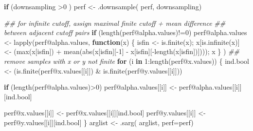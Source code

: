 \documentclass[
  letterpaper,
  DIV=11,
  numbers=noendperiod]{scrartcl}
\newenvironment{Shaded}{\begin{snugshade}}{\end{snugshade}}
\newcommand{\AttributeTok}[1]{\textcolor[rgb]{0.40,0.45,0.13}{#1}}
\newcommand{\ControlFlowTok}[1]{\textcolor[rgb]{0.00,0.23,0.31}{\textbf{#1}}}
\newcommand{\DecValTok}[1]{\textcolor[rgb]{0.68,0.00,0.00}{#1}}
\newcommand{\DocumentationTok}[1]{\textcolor[rgb]{0.37,0.37,0.37}{\textit{#1}}}
\newcommand{\FunctionTok}[1]{\textcolor[rgb]{0.28,0.35,0.67}{#1}}
\newcommand{\NormalTok}[1]{\textcolor[rgb]{0.00,0.23,0.31}{#1}}
\newcommand{\OtherTok}[1]{\textcolor[rgb]{0.00,0.23,0.31}{#1}}
\newcommand{\SpecialCharTok}[1]{\textcolor[rgb]{0.37,0.37,0.37}{#1}}
\begin{document}
\begin{Shaded}
\begin{Highlighting}[]
      \ControlFlowTok{if}\NormalTok{ (downsampling }\SpecialCharTok{\textgreater{}}\DecValTok{0}\NormalTok{ ) perf }\OtherTok{\textless{}{-}} \FunctionTok{.downsample}\NormalTok{( perf, downsampling)}

      \DocumentationTok{\#\# for infinite cutoff, assign maximal finite cutoff + mean difference}
      \DocumentationTok{\#\# between adjacent cutoff pairs}
      \ControlFlowTok{if}\NormalTok{ (}\FunctionTok{length}\NormalTok{(perf}\SpecialCharTok{@}\NormalTok{alpha.values)}\SpecialCharTok{!=}\DecValTok{0}\NormalTok{) perf}\SpecialCharTok{@}\NormalTok{alpha.values }\OtherTok{\textless{}{-}}
        \FunctionTok{lapply}\NormalTok{(perf}\SpecialCharTok{@}\NormalTok{alpha.values,}
               \ControlFlowTok{function}\NormalTok{(x) \{ isfin }\OtherTok{\textless{}{-}} \FunctionTok{is.finite}\NormalTok{(x);}
\NormalTok{                             x[}\FunctionTok{is.infinite}\NormalTok{(x)] }\OtherTok{\textless{}{-}}
\NormalTok{                               (}\FunctionTok{max}\NormalTok{(x[isfin]) }\SpecialCharTok{+}
                                \FunctionTok{mean}\NormalTok{(}\FunctionTok{abs}\NormalTok{(x[isfin][}\SpecialCharTok{{-}}\DecValTok{1}\NormalTok{] }\SpecialCharTok{{-}}
\NormalTok{                                         x[isfin][}\SpecialCharTok{{-}}\FunctionTok{length}\NormalTok{(x[isfin])])));}
\NormalTok{                             x \} )}
      \DocumentationTok{\#\# remove samples with x or y not finite}
      \ControlFlowTok{for}\NormalTok{ (i }\ControlFlowTok{in} \DecValTok{1}\SpecialCharTok{:}\FunctionTok{length}\NormalTok{(perf}\SpecialCharTok{@}\NormalTok{x.values)) \{}
\NormalTok{          ind.bool }\OtherTok{\textless{}{-}}\NormalTok{ (}\FunctionTok{is.finite}\NormalTok{(perf}\SpecialCharTok{@}\NormalTok{x.values[[i]]) }\SpecialCharTok{\&}
                       \FunctionTok{is.finite}\NormalTok{(perf}\SpecialCharTok{@}\NormalTok{y.values[[i]]))}
          
          \ControlFlowTok{if}\NormalTok{ (}\FunctionTok{length}\NormalTok{(perf}\SpecialCharTok{@}\NormalTok{alpha.values)}\SpecialCharTok{\textgreater{}}\DecValTok{0}\NormalTok{)}
\NormalTok{            perf}\SpecialCharTok{@}\NormalTok{alpha.values[[i]] }\OtherTok{\textless{}{-}}\NormalTok{ perf}\SpecialCharTok{@}\NormalTok{alpha.values[[i]][ind.bool]}
          
\NormalTok{          perf}\SpecialCharTok{@}\NormalTok{x.values[[i]] }\OtherTok{\textless{}{-}}\NormalTok{ perf}\SpecialCharTok{@}\NormalTok{x.values[[i]][ind.bool]}
\NormalTok{          perf}\SpecialCharTok{@}\NormalTok{y.values[[i]] }\OtherTok{\textless{}{-}}\NormalTok{ perf}\SpecialCharTok{@}\NormalTok{y.values[[i]][ind.bool]}
\NormalTok{      \}}
\NormalTok{      arglist }\OtherTok{\textless{}{-}} \FunctionTok{.sarg}\NormalTok{( arglist, }\AttributeTok{perf=}\NormalTok{perf)}
    

\end{Highlighting}
\end{Shaded}
\end{document}
